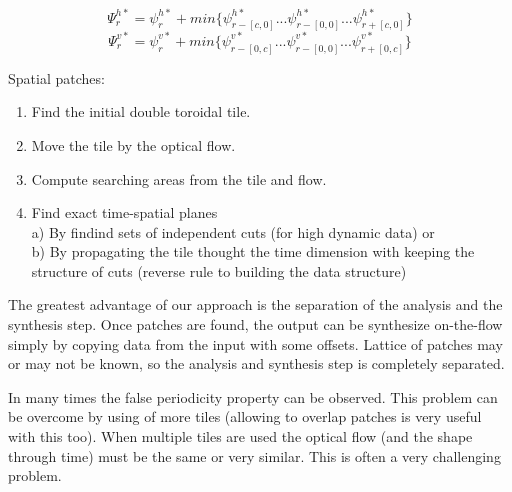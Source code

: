 	\begin{equation} \label{eq:optimal_cuts2D1}						
		 \Psi_{r}^{h*} = \psi_{r}^{h*}  + min\{\psi_{r-[c,0]}^{h*}... \psi_{r-[0,0]}^{h*} ... \psi_{r+[c,0]}^{h*} \} 
	\end{equation} 
	\begin{equation} \label{eq:optimal_cuts2D2}
		 \Psi_{r}^{v*} = \psi_{r}^{v*}  + min\{\psi_{r-[0,c]}^{v*}... \psi_{r-[0,0]}^{v*} ... \psi_{r+[0,c]}^{v*} \} 
	\end{equation} 
		
			\miniframe{}
				{
		          	          {}
					{
						\vspace*{-5mm}
						Spatial patches:\\
						\vspace*{-2mm}
						\begin{enumerate}
						\item  Find the initial double toroidal tile.
						\item  Move the tile by the optical flow.
						\item  Compute searching areas from the tile and flow.
						\item  Find exact time-spatial planes\\
						 a)  By findind sets of independent cuts (for high dynamic data) or \\
					 	 b)  By propagating the tile thought the time dimension with keeping the structure of cuts (reverse rule to building the data structure)
						\end{enumerate}
					}
				}
		\vspace*{2mm}
		
			The greatest advantage of our approach is the separation of the analysis and the synthesis step. Once patches are found, the output can be synthesize on-the-flow simply by copying data from the input with some offsets. Lattice of patches may or may not be known, so the analysis and synthesis step is completely separated. 

			In many times the false periodicity property can be observed. This problem can be overcome by using of more tiles (allowing to overlap patches is very useful with this too). When multiple tiles are used the optical flow (and the shape through time) must be the same or very similar. This is often a very challenging problem.
				
